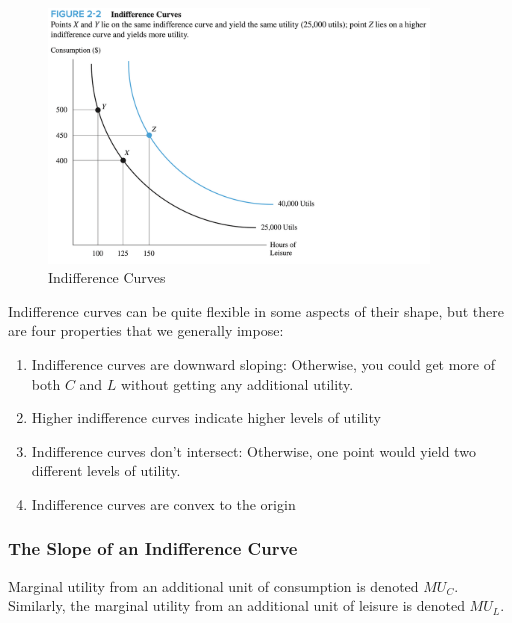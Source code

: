 \FloatBarrier

\begin{figure}[!htb]
    \centering
        \includegraphics[width=0.9\textwidth]{../input/ch_2p3_indiff_curves.png}
    \caption{Indifference Curves}
    \label{fig:ch2p3_indifference_curve}
\end{figure}

\FloatBarrier

Indifference curves can be quite flexible 
in some aspects of their shape, but there
are four properties that we generally impose:

\begin{enumerate}
    \item Indifference curves are downward sloping: Otherwise, you 
        could get more of both $C$ and $L$ without getting any additional utility.
    \item Higher indifference curves indicate higher levels of utility
    \item Indifference curves don't intersect: Otherwise, one point 
        would yield two different levels of utility.
    \item Indifference curves are convex to the origin
\end{enumerate}

\subsubsection{The Slope of an Indifference Curve}

Marginal utility from an additional 
unit of consumption is denoted $MU_C$.
Similarly, the marginal utility from an additional 
unit of leisure is denoted $MU_L$.

